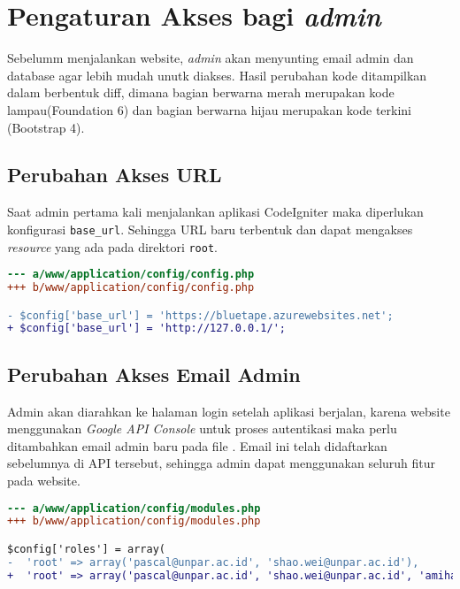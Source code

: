 \section{Pengaturan Akses bagi \textit{admin}}
Sebelumm menjalankan website, \textit{admin} akan menyunting email admin dan database agar lebih mudah unutk diakses. Hasil perubahan kode ditampilkan dalam berbentuk diff, dimana bagian berwarna merah merupakan kode lampau(Foundation 6) dan bagian berwarna hijau merupakan kode terkini  (Bootstrap 4).

\subsection{Perubahan Akses URL}
Saat admin pertama kali menjalankan aplikasi CodeIgniter maka diperlukan konfigurasi \texttt{base\_url}. Sehingga URL baru terbentuk dan dapat mengakses \textit{resource} yang ada pada direktori \texttt{root}. \\

\begin{lstlisting}[language=diff, caption=Perubahan file /config/config.php, label=Entri, basicstyle=\ttfamily, frame=single,
columns=fullflexible, keepspaces=true, breaklines=true]
--- a/www/application/config/config.php
+++ b/www/application/config/config.php

- $config['base_url'] = 'https://bluetape.azurewebsites.net';
+ $config['base_url'] = 'http://127.0.0.1/';
\end{lstlisting}

\subsection{Perubahan Akses Email Admin}

Admin akan diarahkan ke halaman login setelah aplikasi berjalan, karena website menggunakan \textit{Google API Console} untuk proses autentikasi maka perlu ditambahkan email admin baru pada file . Email ini telah didaftarkan sebelumnya di API tersebut, sehingga admin dapat menggunakan seluruh fitur pada website. \\

\begin{lstlisting}[language=diff, caption=Perubahan file /config/modules.php, label=Entri, basicstyle=\ttfamily, frame=single,
columns=fullflexible, keepspaces=true, breaklines=true]
--- a/www/application/config/modules.php
+++ b/www/application/config/modules.php

$config['roles'] = array(
-  'root' => array('pascal@unpar.ac.id', 'shao.wei@unpar.ac.id'),
+  'root' => array('pascal@unpar.ac.id', 'shao.wei@unpar.ac.id', 'amihapsahapsa@gmail.com'),

\end{lstlisting}

